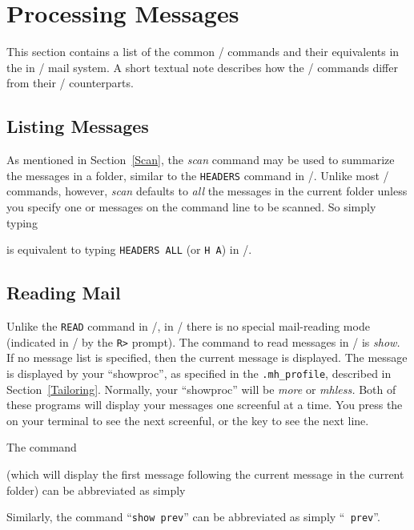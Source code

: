 \section{Processing Messages}

This section contains a list of the common \MM/ commands and their
equivalents in the in \MH/ mail system.  A short textual note describes how
the \MH/ commands differ from their \MM/ counterparts.

\subsection{Listing Messages}

As mentioned in Section~\ref{Scan},
the {\it scan\/} command may be used to summarize the
messages in a folder, similar to the {\tt HEADERS} command in \MM/.  Unlike
most \MH/ commands, however, {\it scan\/} defaults to {\em all\/} the
messages in the current folder unless you specify one or messages on the
command line to be scanned.  So simply typing


is equivalent to typing {\tt HEADERS ALL} (or {\tt H A}) in \MM/.

\subsection{Reading Mail}

Unlike the {\tt READ} command in \MM/, in \MH/ there is no special
mail-reading mode (indicated in \MM/ by the {\tt R>} prompt).
The command to read messages in \MH/ is {\it show.} If no message list is
specified, then the current message is displayed.  The message is displayed
by your ``showproc'', as specified in the \verb|.mh_profile|, described
in Section~\ref{Tailoring}.
Normally, your ``showproc'' will be {\it more\/} or {\it mhless.}
Both of these programs will display your messages one screenful at a time.
You press the  on your terminal to see the next screenful,
or the  key to see the next line.

The command


(which will display the first message following the current message in the
current folder) can be abbreviated as simply


Similarly, the command ``{\tt show prev}'' can be abbreviated as simply ``{\tt
prev}''.

